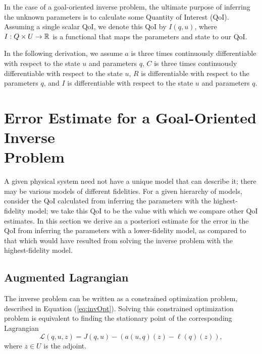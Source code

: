 In the case of a goal-oriented inverse problem, the ultimate purpose of inferring the unknown parameters is to calculate some Quantity of Interest (QoI). Assuming a single scalar QoI, we denote this QoI by $I(q,u)$, where $I:Q\times U\to{\mathbb{R}}$ is a functional that maps the parameters and state to our QoI.

In the following derivation, we assume $a$ is three times continuously differentiable with respect to the state $u$ and parameters $q$, $C$ is three times continuously differentiable with respect to the state $u$, $R$ is differentiable with respect to the parameters $q$, and $I$ is differentiable with respect to the state $u$ and parameters $q$.

\section[Error Estimate for a Goal-Oriented Inverse Problem]{Error Estimate for a Goal-Oriented Inverse \\Problem}  \label{sec:deriv}

A given physical system need not have a unique model that can describe it; there may be various models of different fidelities. For a given hierarchy of models, consider the QoI calculated from inferring the parameters with the highest-fidelity model; we take this QoI to be the value with which we compare other QoI estimates. In this section we derive an a posteriori estimate for the error in the QoI from inferring the parameters with a lower-fidelity model, as compared to that which would have resulted from solving the inverse problem with the highest-fidelity model.

\subsection{Augmented Lagrangian} \label{sec:augLag}

The inverse problem can be written as a constrained optimization problem, described in Equation (\ref{eq:invOpt}). Solving this constrained optimization problem is equivalent to finding the stationary point of the corresponding Lagrangian
\begin{equation}
\mathcal{L}(q,u,z)= J(q,u)-(a(u,q)(z)-\ell(q)(z)),
\end{equation}
where $z\in U$ is the adjoint. 

